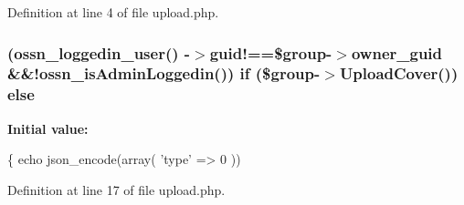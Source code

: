 Definition at line 4 of file upload.\+php.

\subsubsection[{\texorpdfstring{else}{else}}]{ ({\bf ossn\+\_\+loggedin\+\_\+user}() -\/$>$guid!==\$group-\/$>${\bf owner\+\_\+guid} \&\&!{\bf ossn\+\_\+is\+Admin\+Loggedin}()) {\bf if} (\$group-\/$>$Upload\+Cover()) else}\hypertarget{_ossn_groups_2actions_2group_2cover_2upload_8php_ae343b4529d755a3e4da1699b20471137}{}\label{_ossn_groups_2actions_2group_2cover_2upload_8php_ae343b4529d755a3e4da1699b20471137}
{\bfseries Initial value\+:}
\begin{DoxyCode}
\{
        echo json\_encode(array(
                \textcolor{stringliteral}{'type'} => 0
        ))
\end{DoxyCode}


Definition at line 17 of file upload.\+php.

